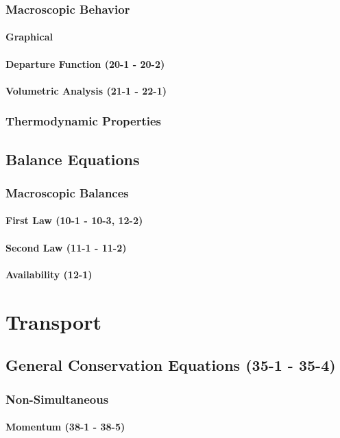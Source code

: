\documentclass{mitqualif}
\begin{document}
\subsection{Macroscopic Behavior}
\subsubsection{Graphical}
\subsubsection{Departure Function (20-1 - 20-2)}
\subsubsection{Volumetric Analysis (21-1 - 22-1)}
\subsection{Thermodynamic Properties}
\section{Balance Equations}
\subsection{Macroscopic Balances}
\subsubsection{First Law (10-1 - 10-3, 12-2)}
\subsubsection{Second Law (11-1 - 11-2)}
\subsubsection{Availability (12-1)}
\newpage
\chapter{Transport}
\section{General Conservation Equations (35-1 - 35-4)}
\subsection{Non-Simultaneous}
\subsubsection{Momentum (38-1 - 38-5)}
\end{document}
